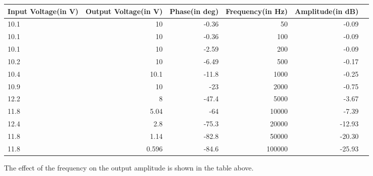 \begin{adjustwidth}{-2.5 cm}{-2.5 cm}\centering\begin{threeparttable}[!htb]
        \scriptsize
        \begin{tabular}{lrrrrr}\toprule
            \textbf{Input Voltage(in V)} & \textbf{Output Voltage(in V)} & \textbf{Phase(in deg)} & \textbf{Frequency(in Hz)} & \textbf{Amplitude(in dB)} \\\midrule
            10.1                         & 10                            & -0.36                  & 50                        & -0.09                     \\
            10.1                         & 10                            & -0.36                  & 100                       & -0.09                     \\
            10.1                         & 10                            & -2.59                  & 200                       & -0.09                     \\
            10.2                         & 10                            & -6.49                  & 500                       & -0.17                     \\
            10.4                         & 10.1                          & -11.8                  & 1000                      & -0.25                     \\
            10.9                         & 10                            & -23                    & 2000                      & -0.75                     \\
            12.2                         & 8                             & -47.4                  & 5000                      & -3.67                     \\
            11.8                         & 5.04                          & -64                    & 10000                     & -7.39                     \\
            12.4                         & 2.8                           & -75.3                  & 20000                     & -12.93                    \\
            11.8                         & 1.14                          & -82.8                  & 50000                     & -20.30                    \\
            11.8                         & 0.596                         & -84.6                  & 100000                    & -25.93                    \\
            \bottomrule
        \end{tabular}
        \caption{The effect of the frequency on the output amplitude is shown in the table above.}\label{tab: }
    \end{threeparttable}\end{adjustwidth}